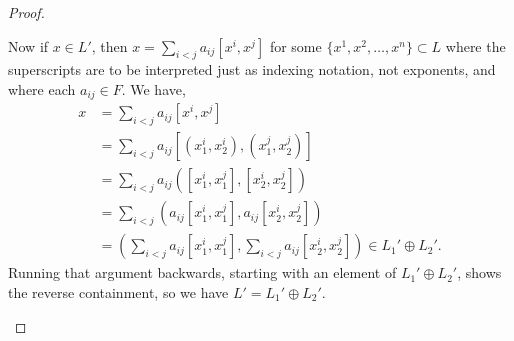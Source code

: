 \documentclass[12pt]{article}
\theoremstyle{definition}
\begin{document}
\begin{proof}
\begin{enumerate}[label=(\alph*)]
		      Now if $x \in L'$, then $x = \sum_{i < j} a_{ij}[x^i, x^j]$ for some $\lbrace x^1, x^2, \dots, x^n \rbrace \subset L$ where the superscripts are to be interpreted just as indexing notation, not exponents, and where each $a_{ij} \in F$.
		      We have, \begin{align*}
			      x & = \sum_{i < j} a_{ij}[x^i, x^j]                                                                         \\
			        & = \sum_{i < j} a_{ij}[(x^i_1, x^i_2), (x^j_1, x^j_2)]                                                   \\
			        & = \sum_{i < j} a_{ij}([x^i_1, x^j_1], [x^i_2, x^j_2])                                                   \\
			        & = \sum_{i < j} (a_{ij}[x^i_1, x^j_1], a_{ij}[x^i_2, x^j_2])                                             \\
			        & = \left(\sum_{i < j}a_{ij}[x^i_1, x^j_1],\sum_{i < j} a_{ij}[x^i_2, x^j_2]\right) \in L_1' \oplus L_2'.
		      \end{align*}
		      Running that argument backwards, starting with an element of $L_1' \oplus L_2'$, shows the reverse containment, so we have $L' = L_1' \oplus L_2'$.
	\end{enumerate}
\end{proof}
\end{document}
